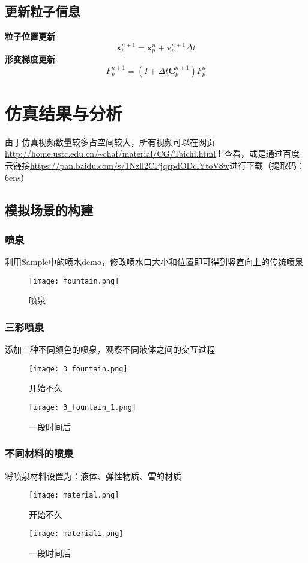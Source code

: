 \documentclass[14pt]{scrartcl} %
\begin{document}
\subsection{更新粒子信息}
\textbf{粒子位置更新}
\begin{equation}
\boldsymbol x_p^{n+1}=\boldsymbol x_p^n+\boldsymbol v_p^{n+1}\Delta t
\end{equation}
\textbf{形变梯度更新}
\begin{equation}
F_p^{n+1}=(I+\Delta t\boldsymbol C_p^{n+1})F_p^n
\end{equation}
\pagebreak
\section{仿真结果与分析}
由于仿真视频数量较多占空间较大，所有视频可以在网页\url{http://home.ustc.edu.cn/~chaf/material/CG/Taichi.html}上查看，或是通过百度云链接\url{https://pan.baidu.com/s/1Nzll2CPjqrpdODclYtoV8w}进行下载（提取码：6ens）
\subsection{模拟场景的构建}
\subsubsection{喷泉}
利用Sample中的喷水demo，修改喷水口大小和位置即可得到竖直向上的传统喷泉

\begin{figure}[h] %
	\centering
	\texttt{[image: fountain.png]} %
	\caption{喷泉}
\end{figure}
\pagebreak
\subsubsection{三彩喷泉}
添加三种不同颜色的喷泉，观察不同液体之间的交互过程
\begin{figure}[h]
	\centering
	\texttt{[image: 3\_fountain.png]} %
	\caption{开始不久}
	
	\centering
	\texttt{[image: 3\_fountain\_1.png]} %
	\caption{一段时间后}
\end{figure}
\pagebreak
\subsubsection{不同材料的喷泉}
将喷泉材料设置为：液体、弹性物质、雪的材质
\begin{figure}[h]
	\centering
	\texttt{[image: material.png]} %
	\caption{开始不久}
	
	\centering
	\texttt{[image: material1.png]} %
	\caption{一段时间后}
\end{figure}
\end{document}
